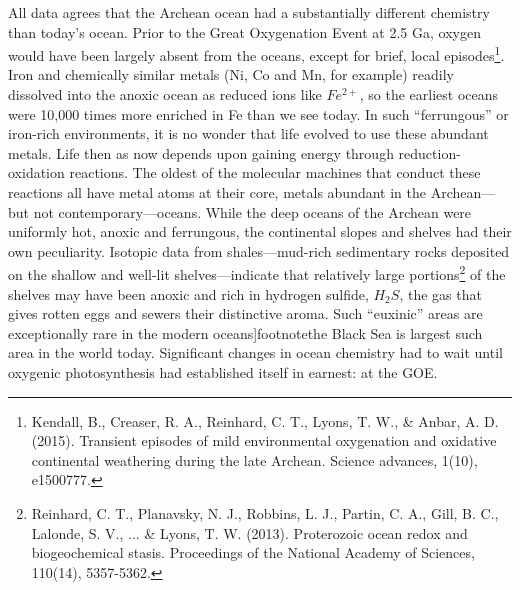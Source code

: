 \documentclass[amstex,12pt]{book}
\begin{document}
{All data agrees that the Archean ocean had a substantially different chemistry than today's ocean. Prior to the Great Oxygenation Event at 2.5 Ga, oxygen would have been largely absent from the oceans, except for brief, local episodes\footnote{Kendall, B., Creaser, R. A., Reinhard, C. T., Lyons, T. W., \& Anbar, A. D. (2015). Transient episodes of mild environmental oxygenation and oxidative continental weathering during the late Archean. Science advances, 1(10), e1500777.}. Iron and chemically similar metals (Ni, Co and Mn, for example) readily dissolved into the anoxic ocean as reduced ions like $Fe^{2+}$, so the earliest oceans were 10,000 times more enriched in Fe than we see today. In such ``ferrungous'' or iron-rich environments, it is no wonder that life evolved to use these abundant metals. Life then as now depends upon gaining energy through reduction-oxidation reactions. The oldest of the molecular machines that conduct these reactions all have metal atoms at their core, metals abundant in the Archean---but not contemporary---oceans. While the deep oceans of the Archean were uniformly hot, anoxic and ferrungous, the continental slopes and shelves had their own peculiarity. Isotopic data from shales---mud-rich sedimentary rocks deposited on the shallow and well-lit shelves---indicate that relatively large portions\footnote{Reinhard, C. T., Planavsky, N. J., Robbins, L. J., Partin, C. A., Gill, B. C., Lalonde, S. V., ... \& Lyons, T. W. (2013). Proterozoic ocean redox and biogeochemical stasis. Proceedings of the National Academy of Sciences, 110(14), 5357-5362.} of the shelves may have been anoxic and rich in hydrogen sulfide, $H_2S$, the gas that gives rotten eggs and sewers their distinctive aroma. Such ``euxinic'' areas are exceptionally rare in the modern oceans]footnote{the Black Sea is largest such area in the world today}. Significant changes in ocean chemistry had to wait until oxygenic photosynthesis had established itself in earnest: at the GOE.  
}
\end{document}
